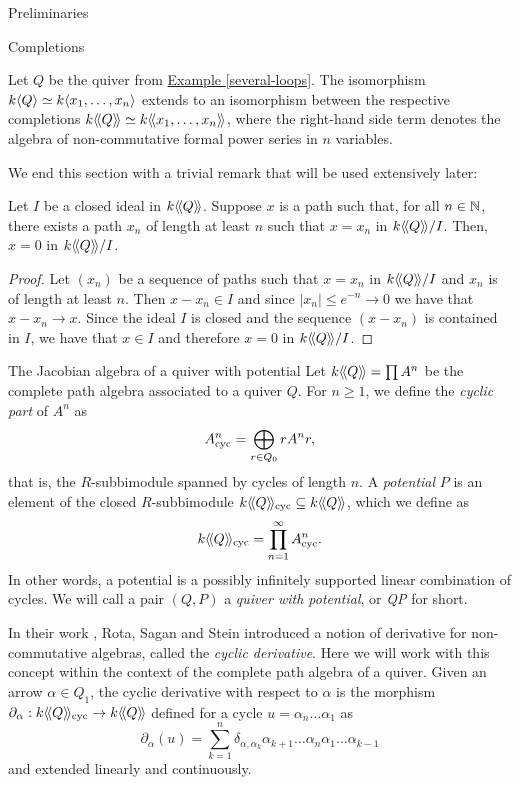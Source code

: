 \begin{chapter}{Preliminaries}
\begin{section}{Completions}
\begin{exmp}Let $Q$ be the quiver from \hyperref[several-loops]{Example \ref*{several-loops}}. The isomorphism $k\langle Q\rangle\simeq k\langle x_1,\dots,x_n\rangle$ extends to an isomorphism between the respective completions $k\langle\!\langle Q\rangle\!\rangle\simeq k\langle\!\langle x_1,\dots,x_n\rangle\!\rangle$, where the right-hand side term denotes the algebra of non-commutative formal power series in $n$ variables.
\end{exmp}

We end this section with a trivial remark that will be used extensively later:

\begin{obs}\label{arbitrarily-long} Let $I$ be a closed ideal in $k\langle\!\langle Q\rangle\!\rangle$. Suppose $x$ is a path such that, for all $n\in \mathbb{N}$, there exists a path $x_n$ of length at least $n$ such that $x=x_n$ in $k\langle\!\langle Q\rangle\!\rangle/I$. Then, $x=0$ in $k\langle\!\langle Q\rangle\!\rangle/I$.
\end{obs}
\begin{proof} Let $(x_n)$ be a sequence of paths such that $x=x_n$ in $k\langle\!\langle Q\rangle\!\rangle/I$ and $x_n$ is of length at least $n$. Then $x-x_n\in I$ and since $|x_n|\leq e^{-n}\to 0$ we have that $x-x_n\to x$. Since the ideal $I$ is closed and the sequence $(x-x_n)$ is contained in $I$, we have that $x\in I$ and therefore $x=0$ in $k\langle\!\langle Q\rangle\!\rangle/I$.
\end{proof}
\end{section}

\begin{section}{The Jacobian algebra of a quiver with potential}
Let $k\langle\!\langle Q\rangle\!\rangle=\prod A^n$ be the complete path algebra associated to a quiver $Q$. For $n\geq 1$, we define the \emph{cyclic part} of $A^n$ as
\[
A^n_{\mathrm{cyc}} = \bigoplus_{r\in Q_0} rA^nr,
\]
that is, the $R$-subbimodule spanned by cycles of length $n$. A \emph{potential} $P$ is an element of the closed $R$-subbimodule $k\langle\!\langle Q\rangle\!\rangle_{\mathrm{cyc}}\subseteq k\langle\!\langle Q\rangle\!\rangle$, which we define as
\[
k\langle\!\langle Q\rangle\!\rangle_{\mathrm{cyc}}=\prod_{n=1}^\infty A^n_{\mathrm{cyc}}.
\]
In other words, a potential is a possibly infinitely supported linear combination of cycles. We will call a pair $(Q,P)$ a \emph{quiver with potential}, or \emph{QP} for short.

In their work \cite{RSS80}, Rota, Sagan and Stein introduced a notion of derivative for non-commutative algebras, called the \emph{cyclic derivative}. Here we will work with this concept within the context of the complete path algebra of a quiver. Given an arrow $\alpha\in Q_1$, the cyclic derivative with respect to $\alpha$ is the morphism $\partial_\alpha:k\langle\!\langle Q\rangle\!\rangle_{\mathrm{cyc}}\to k\langle\!\langle Q\rangle\!\rangle$ defined for a cycle $u=\alpha_n\dots\alpha_1$ as
\[
\partial_\alpha(u) = \sum_{k=1}^n \delta_{\alpha, \alpha_k}\alpha_{k+1}\dots\alpha_n\alpha_1\dots\alpha_{k-1}
\]
and extended linearly and continuously.


\end{section}
\end{chapter}
